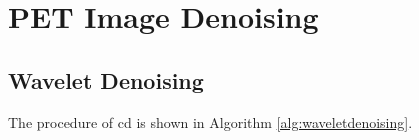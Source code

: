 \section{PET Image Denoising}





\iffalse
\begin{algorithm}
	\caption{Wavelet Denoising}\label{alg:waveletdenoising2}
	\begin{algorithmic}[1]
		\Require $image$
		\Ensure $denoise\_image$
		\Procedure{waveletdenoising($image$)}{}
		\State $\textit{stringlen} \gets \text{length of }\textit{string}$
		\State $i \gets \textit{patlen}$
		\BState \emph{top}:
		\If {$i > \textit{stringlen}$} \Return false
		\EndIf
		\State $j \gets \textit{patlen}$
		\BState \emph{loop}:
		\If {$\textit{string}(i) = \textit{path}(j)$}
		\State $j \gets j-1$.
		\State $i \gets i-1$.
		\State \textbf{goto} \emph{loop}.
		\State \textbf{close};
		\EndIf
		\State $i \gets i+\max(\textit{delta}_1(\textit{string}(i)),\textit{delta}_2(j))$.
		\State \textbf{goto} \emph{top}.
		\EndProcedure
	\end{algorithmic}
\end{algorithm}


\begin{algorithm}
	\caption{PDFB Decomposition}\label{alg:pdfbdec}
	\begin{algorithmic}[1]
		\Require $x, pfilt, dfilt, nlevs$
		\Ensure $y$
		\Procedure{pdfbdec($x, pfilt, dfilt, nlevs$)}{}
			\If {$nlev=0$}  \Comment Wavelet Decomposition
				\State $y=x$
			\Else \Comment Contourlet Decomposition
				\State get the pyramidal filters from the filter name \Comment $h, g$
					
			\EndIf
		\EndProcedure
	\end{algorithmic}	
\end{algorithm}
\fi




\subsection{Wavelet Denoising}
The procedure of \gls{cd} is shown in Algorithm \ref{alg:waveletdenoising}.


